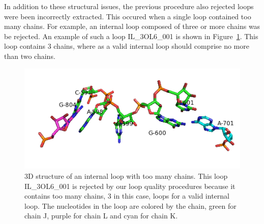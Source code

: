 
In addition to these structural issues, the previous procedure also rejected
loops were been incorrectly extracted. This occured when a single loop
contained too many chains. For example, an internal loop composed of three or more
chains was be rejected. An example of such a loop IL\_3OL6\_001 is shown in
Figure~\ref{fig:too-many-chains}. This loop contains 3 chains, where as a 
valid internal loop should comprise no more than two chains.

\begin{figure}
  \includegraphics[width=\textwidth]{chapter-5/figs/loops/IL-3OL6-001}
  \caption{3D structure of an internal loop with too many chains. This loop
    IL\_3OL6\_001 is rejected by our loop quality procedures because it contains
    too many chains, 3 in this case, loops for a valid internal loop. The
  nucleotides in the loop are colored by the chain, green for chain J, purple
for chain L and cyan for chain K.}
  \label{fig:too-many-chains}
\end{figure}

